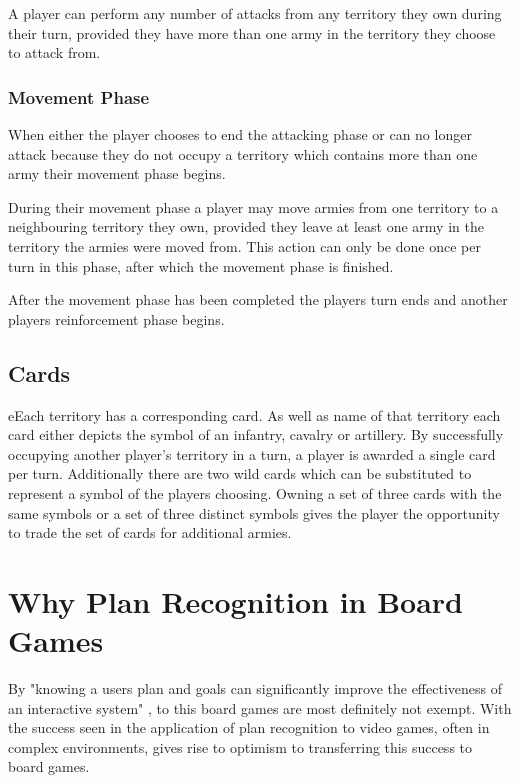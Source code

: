 \documentclass[parskip]{cs4rep}
\begin{document}
A player can perform any number of attacks from any territory they own during their turn, provided they have more than one army in the territory they choose to attack from.

\subsubsection{Movement Phase}

When either the player chooses to end the attacking phase or can no longer attack because they do not occupy a territory which contains more than one army their movement phase begins.

During their movement phase a player may move armies from one territory to a neighbouring territory they own, provided they leave at least one army in the territory the armies were moved from. This action can only be done once per turn in this phase, after which the movement phase is finished.

After the movement phase has been completed the players turn ends and another players reinforcement phase begins.
\newpage

\subsection{Cards}

eEach territory has a corresponding card. As well as name of that territory each card either depicts the symbol of an infantry, cavalry or artillery. By successfully occupying another player's territory in a turn, a player is awarded a single card per turn. Additionally there are two wild cards which can be substituted to represent a symbol of the players choosing. Owning a set of three cards with the same symbols or a set of three distinct symbols gives the player the opportunity to trade the set of cards for additional armies.

\section{Why Plan Recognition in Board Games}

By "knowing a users plan and goals can significantly improve the effectiveness of an interactive system" \cite{Carberry:2001:TPR:598284.598348}, to this board games are most definitely not exempt. With the success seen in the application of plan recognition to video games, often in complex environments, gives rise to optimism to transferring this success to board games.
\end{document}
